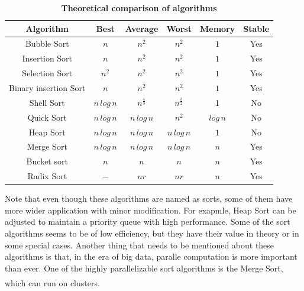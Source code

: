 \documentclass[cn,black,12pt,normal]{elegantnote}
\newcommand{\uct}[1]{\textsuperscript{\textsuperscript{\cite{#1}}}}
\begin{document}
\begin{table}[H]
    \caption{\textbf{Theoretical comparison of algorithms}}
    \centering
    \begin{tabular}{cccccc}
        \toprule
        Algorithm             & Best            & Average           & Worst             & Memory     & Stable \\
        \midrule
        Bubble Sort           & $n$             & $n^2$             & $n^2$             & $1$        & Yes    \\
        Insertion Sort        & $n$             & $n^2$             & $n^2$             & $1$        & Yes    \\
        Selection Sort        & $n^2$           & $n^2$             & $n^2$             & $1$        & Yes    \\
        Binary insertion Sort & $n$             & $n^2$             & $n^2$             & $1$        & Yes    \\
        Shell Sort            & $n \, log \, n$ & $n^{\frac{4}{3}}$ & $n^{\frac{3}{2}}$ & 1          & No     \\
        Quick Sort            & $n \, log \, n$ & $n \, log \, n$   & $n^2$             & $log \, n$ & No     \\
        Heap Sort             & $n \, log \, n$ & $n \, log \, n$   & $n \, log \, n$   & $1$        & No     \\
        Merge Sort            & $n \, log \, n$ & $n \, log \, n$   & $n \, log \, n$   & $n$        & Yes    \\
        Bucket sort           & $n$             & $n$               & $n$               & $n$        & Yes    \\
        Radix Sort            & $-$             & $nr$              & $nr$              & $n$        & Yes    \\
        \bottomrule
    \end{tabular}
\end{table}

Note that even though these algorithms are named as sorts, some of them have more wider application with minor modification. For exapmle, Heap Sort can be adjusted to maintain a priority queue with high performance. Some of the sort algorithms seems to be of low efficiency, but they have their value in theory or in some special cases. Another thing that needs to be mentioned about these algorithms is that, in the era of big data, paralle computation is more important than ever. One of the highly parallelizable sort algorithms is the Merge Sort, which can run on clusters.\uct{ajtai19830}
\end{document}
